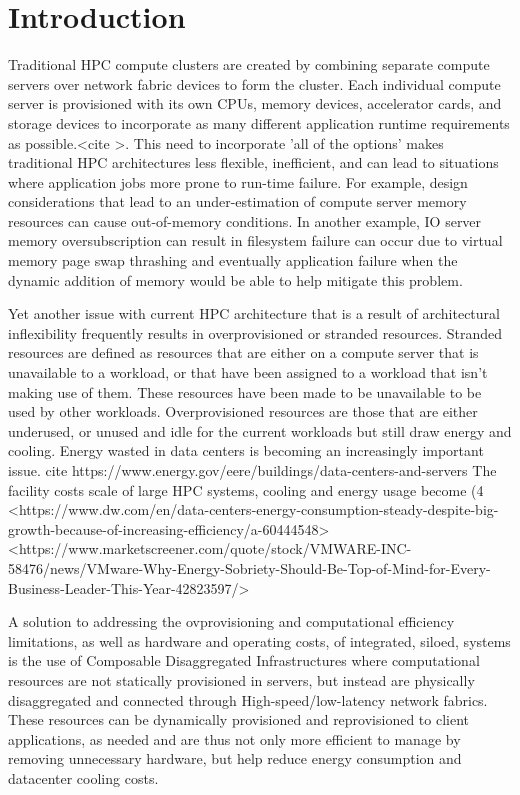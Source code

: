 \section{Introduction}

Traditional HPC compute clusters are created by combining separate compute servers over network fabric devices to form the cluster.  Each individual compute server is provisioned with its own CPUs, memory devices, accelerator cards, and storage devices to incorporate as many different application runtime requirements as possible.<cite >. This need to incorporate 'all of the options' makes traditional HPC architectures less flexible, inefficient, and can lead to situations where application jobs more prone to run-time failure.    
For example, design considerations that lead to an under-estimation of compute server memory resources can cause out-of-memory conditions.  In another example, IO server memory oversubscription can result in filesystem failure can occur due to virtual memory page swap thrashing and eventually application failure when the dynamic addition of memory would be able to help mitigate this problem.  

Yet another issue with current HPC architecture that is a result of architectural inflexibility frequently results in overprovisioned or stranded resources.  Stranded resources are defined as resources that are either on a compute server that is unavailable to a workload, or that have been assigned to a workload that isn't making use of them.  These resources have been made to be unavailable to be used by other workloads. Overprovisioned resources are those that are either underused, or unused and idle for the current workloads but still draw energy and cooling.  Energy wasted in data centers is becoming an increasingly important issue.  {cite https://www.energy.gov/eere/buildings/data-centers-and-servers } 
The facility costs scale of large HPC systems, cooling and energy usage become  
  (4%
  <https://www.dw.com/en/data-centers-energy-consumption-steady-despite-big-growth-because-of-increasing-efficiency/a-60444548>
  <https://www.marketscreener.com/quote/stock/VMWARE-INC-58476/news/VMware-Why-Energy-Sobriety-Should-Be-Top-of-Mind-for-Every-Business-Leader-This-Year-42823597/>

A solution to addressing the ovprovisioning and computational efficiency limitations, as well as hardware and operating costs, of integrated, siloed, systems is the use of Composable Disaggregated Infrastructures where computational resources are not statically provisioned in servers, but instead are physically disaggregated and connected through High-speed/low-latency network fabrics.  These resources can be dynamically provisioned and reprovisioned to client applications, as needed and are thus not only more efficient to manage by removing unnecessary hardware, but help reduce energy consumption and datacenter cooling costs.


